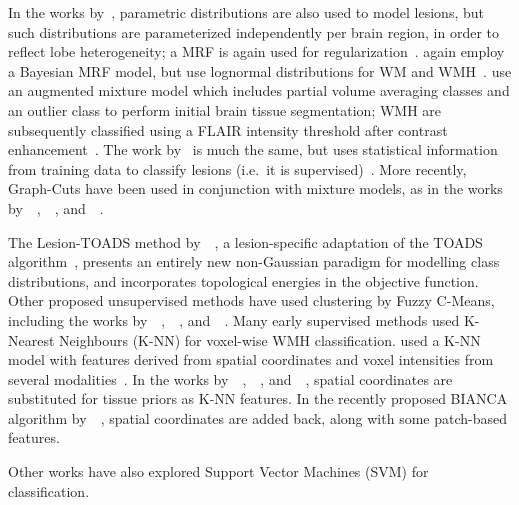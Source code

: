 In the works by~\citeauthor{Harmouche2006}, parametric distributions are also used to model lesions, but such distributions are parameterized independently per brain region, in order to reflect lobe heterogeneity; a MRF is again used for regularization~\cite{Harmouche2006,Harmouche2015}.
\citeauthor{Schwarz2009} again employ a Bayesian MRF model, but use lognormal distributions for WM and WMH~\cite{Schwarz2009}.
\citeauthor{Souplet2008} use an augmented mixture model which includes partial volume averaging classes and an outlier class to perform initial brain tissue segmentation; WMH are subsequently classified using a FLAIR intensity threshold after contrast enhancement~\cite{Souplet2008}. 
The work by~\citeauthor{Herskovits2008} is much the same, but uses statistical information from training data to classify lesions (i.e.\ it is supervised)~\cite{Herskovits2008}.
More recently, Graph-Cuts have been used in conjunction with mixture models, as in the works by~\citeauthor{Garcia-Lorenzo2009}~\cite{Garcia-Lorenzo2009},~\citeauthor{Tomas-Fernandez2015}~\cite{Tomas-Fernandez2015}, and~\citeauthor{Strumia2016}~\cite{Strumia2016}.
\par
The Lesion-TOADS method by~\citeauthor{Shiee2010}~\cite{Shiee2010}, a lesion-specific adaptation of the TOADS algorithm~\cite{Bazin2008}, presents an entirely new non-Gaussian paradigm for modelling class distributions, and incorporates topological energies in the objective function.
Other proposed unsupervised methods have used clustering by Fuzzy C-Means, including the works by~\citeauthor{Admiraal-Behloul2005}~\cite{Admiraal-Behloul2005},~\citeauthor{Gibson2010}~\cite{Gibson2010}, and~\citeauthor{Valverde2016}~\cite{Valverde2016}.
Many early supervised methods used K-Nearest Neighbours (K-NN) for voxel-wise WMH classification.
\citeauthor{Anbeek2005} used a K-NN model with features derived from spatial coordinates and voxel intensities from several modalities~\cite{Anbeek2004,Anbeek2005}.
In the works by~\citeauthor{Wu2006}~\cite{Wu2006},~\citeauthor{Steenwijk2013}~\cite{Steenwijk2013}, and~\citeauthor{Fartaria2015}~\cite{Fartaria2015}, spatial coordinates are substituted for tissue priors as K-NN features.
In the recently proposed BIANCA algorithm by~\citeauthor{Griffanti2016}~\cite{Griffanti2016}, spatial coordinates are added back, along with some patch-based features.
\par
Other works have also explored Support Vector Machines (SVM) for classification.
